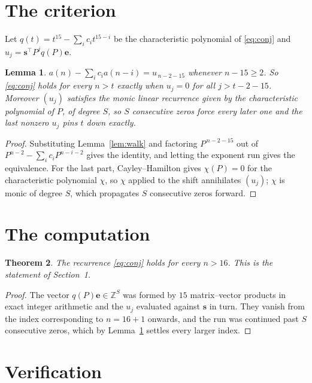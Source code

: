 \documentclass[11pt,a4paper]{article}
\theoremstyle{plain}
\newtheorem{theorem}{Theorem}
\newtheorem{lemma}[theorem]{Lemma}
\theoremstyle{definition}
\begin{document}
\section{The criterion}

Let $q(t)=t^{15}-\sum_i c_i t^{15-i}$ be the characteristic polynomial of
\eqref{eq:conj} and $u_j=\mathbf{s}^{\!\top}P^{j}q(P)\mathbf{e}$.

\begin{lemma}\label{lem:crit}
$a(n)-\sum_i c_i a(n-i)=u_{\,n-2-15}$ whenever $n-15\ge2$. So \eqref{eq:conj}
holds for every $n>t$ exactly when $u_j=0$ for all $j>t-2-15$. Moreover $(u_j)$
satisfies the monic linear recurrence given by the characteristic polynomial of $P$, of
degree $S$, so $S$ consecutive zeros force every later one and the last nonzero $u_j$ pins
$t$ down exactly.
\end{lemma}

\begin{proof}
Substituting Lemma~\ref{lem:walk} and factoring $P^{\,n-2-15}$ out of
$P^{n-2}-\sum_i c_i P^{n-i-2}$ gives the identity, and letting the exponent run gives the
equivalence. For the last part, Cayley--Hamilton gives $\chi(P)=0$ for the characteristic
polynomial $\chi$, so $\chi$ applied to the shift annihilates $(u_j)$; $\chi$ is monic of
degree $S$, which propagates $S$ consecutive zeros forward.
\end{proof}

\section{The computation}

\begin{theorem}
The recurrence \eqref{eq:conj} holds for every $n>16$. This is the statement of
Section~1.
\end{theorem}

\begin{proof}
The vector $q(P)\mathbf{e}\in\mathbb{Z}^{S}$ was formed by $15$ matrix--vector
products in exact integer arithmetic and the $u_j$ evaluated against $\mathbf{s}$ in turn.
They vanish from the index corresponding to $n=16+1$ onwards, and the run was continued
past $S$ consecutive zeros, which by Lemma~\ref{lem:crit} settles every larger index.
\end{proof}

\section{Verification}
\end{document}
